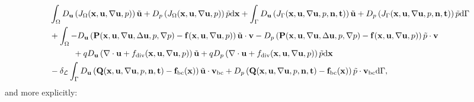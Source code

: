 \documentclass[oneside]{book}
\numberwithin{equation}{section}
\begin{document}
\begin{align*}
    &\int_\Omega D_{\bf u}\left(J_\Omega({\bf x},{\bf u},\nabla{\bf u},p)\right)\tilde{\bf u} + D_p\left(J_\Omega({\bf x},{\bf u},\nabla{\bf u},p)\right)\tilde{p}{\rm d}{\bf x} + \int_\Gamma D_{\bf u}\left(J_\Gamma({\bf x},{\bf u},\nabla{\bf u},p,{\bf n},{\bf t})\right)\tilde{\bf u} + D_p\left(J_\Gamma({\bf x},{\bf u},\nabla{\bf u},p,{\bf n},{\bf t})\right)\tilde{p}{\rm d}\Gamma\\
    &+ \int_\Omega -D_{\bf u}\left({\bf P}({\bf x},{\bf u},\nabla{\bf u},\Delta{\bf u},p,\nabla p) - {\bf f}({\bf x},{\bf u},\nabla{\bf u},p)\right)\tilde{\bf u}\cdot{\bf v} - D_p\left({\bf P}({\bf x},{\bf u},\nabla{\bf u},\Delta{\bf u},p,\nabla p) - {\bf f}({\bf x},{\bf u},\nabla{\bf u},p)\right)\tilde{p}\cdot{\bf v}\\
    &\hspace{1cm} + qD_{\bf u}\left(\nabla\cdot{\bf u} + f_{\rm div}({\bf x},{\bf u},\nabla{\bf u},p)\right)\tilde{\bf u} + qD_p\left(\nabla\cdot{\bf u} + f_{\rm div}({\bf x},{\bf u},\nabla{\bf u},p)\right)\tilde{p}{\rm d}{\bf x}\\
    &- \delta_{\mathcal{L}}\int_\Gamma D_{\bf u}\left({\bf Q}({\bf x},{\bf u},\nabla{\bf u},p,{\bf n},{\bf t}) - {\bf f}_{\rm bc}({\bf x})\right)\tilde{\bf u}\cdot{\bf v}_{\rm bc} + D_p\left({\bf Q}({\bf x},{\bf u},\nabla{\bf u},p,{\bf n},{\bf t}) - {\bf f}_{\rm bc}({\bf x})\right)\tilde{p}\cdot{\bf v}_{\rm bc}{\rm d}\Gamma,
\end{align*}
and more explicitly:
\end{document}
